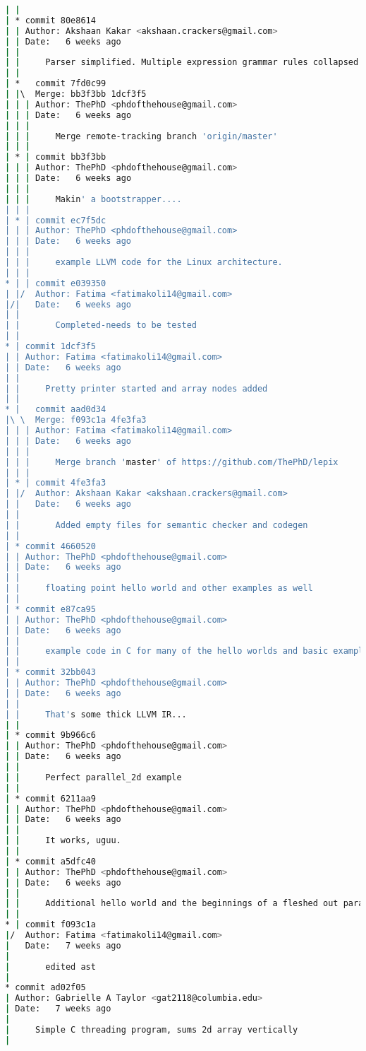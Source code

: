 \begin{lstlisting}[language=bash]
| |   
| * commit 80e8614
| | Author: Akshaan Kakar <akshaan.crackers@gmail.com>
| | Date:   6 weeks ago
| | 
| |     Parser simplified. Multiple expression grammar rules collapsed into single rule
| |     
| *   commit 7fd0c99
| |\  Merge: bb3f3bb 1dcf3f5
| | | Author: ThePhD <phdofthehouse@gmail.com>
| | | Date:   6 weeks ago
| | | 
| | |     Merge remote-tracking branch 'origin/master'
| | |    
| * | commit bb3f3bb
| | | Author: ThePhD <phdofthehouse@gmail.com>
| | | Date:   6 weeks ago
| | | 
| | |     Makin' a bootstrapper....
| | |    
| * | commit ec7f5dc
| | | Author: ThePhD <phdofthehouse@gmail.com>
| | | Date:   6 weeks ago
| | | 
| | |     example LLVM code for the Linux architecture.
| | |    
* | | commit e039350
| |/  Author: Fatima <fatimakoli14@gmail.com>
|/|   Date:   6 weeks ago
| |   
| |       Completed-needs to be tested
| |   
* | commit 1dcf3f5
| | Author: Fatima <fatimakoli14@gmail.com>
| | Date:   6 weeks ago
| | 
| |     Pretty printer started and array nodes added
| |     
* |   commit aad0d34
|\ \  Merge: f093c1a 4fe3fa3
| | | Author: Fatima <fatimakoli14@gmail.com>
| | | Date:   6 weeks ago
| | | 
| | |     Merge branch 'master' of https://github.com/ThePhD/lepix
| | |    
| * | commit 4fe3fa3
| |/  Author: Akshaan Kakar <akshaan.crackers@gmail.com>
| |   Date:   6 weeks ago
| |   
| |       Added empty files for semantic checker and codegen
| |   
| * commit 4660520
| | Author: ThePhD <phdofthehouse@gmail.com>
| | Date:   6 weeks ago
| | 
| |     floating point hello world and other examples as well
| |   
| * commit e87ca95
| | Author: ThePhD <phdofthehouse@gmail.com>
| | Date:   6 weeks ago
| | 
| |     example code in C for many of the hello worlds and basic examples
| |   
| * commit 32bb043
| | Author: ThePhD <phdofthehouse@gmail.com>
| | Date:   6 weeks ago
| | 
| |     That's some thick LLVM IR...
| |   
| * commit 9b966c6
| | Author: ThePhD <phdofthehouse@gmail.com>
| | Date:   6 weeks ago
| | 
| |     Perfect parallel_2d example
| |   
| * commit 6211aa9
| | Author: ThePhD <phdofthehouse@gmail.com>
| | Date:   6 weeks ago
| | 
| |     It works, uguu.
| |   
| * commit a5dfc40
| | Author: ThePhD <phdofthehouse@gmail.com>
| | Date:   6 weeks ago
| | 
| |     Additional hello world and the beginnings of a fleshed out parallel looping structure
| |   
* | commit f093c1a
|/  Author: Fatima <fatimakoli14@gmail.com>
|   Date:   7 weeks ago
|   
|       edited ast
|  
* commit ad02f05
| Author: Gabrielle A Taylor <gat2118@columbia.edu>
| Date:   7 weeks ago
| 
|     Simple C threading program, sums 2d array vertically
|  

\end{lstlisting}

